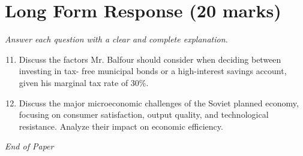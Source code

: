 \documentclass[12pt]{article}
\begin{document}
\section*{Long Form Response (20 marks)}
\textit{Answer each question with a clear and complete explanation.}
\begin{enumerate}[label=\arabic*.]
\setcounter{enumi}{10}
\item Discuss the factors Mr. Balfour should consider when deciding between investing in tax- free municipal bonds or a high-interest savings account, given his marginal tax rate of 30\%.
\item Discuss the major microeconomic challenges of the Soviet planned economy, focusing on consumer satisfaction, output quality, and technological resistance. Analyze their impact on economic efficiency.
\end{enumerate}

\vfill
\noindent\textit{End of Paper}
\end{document}
